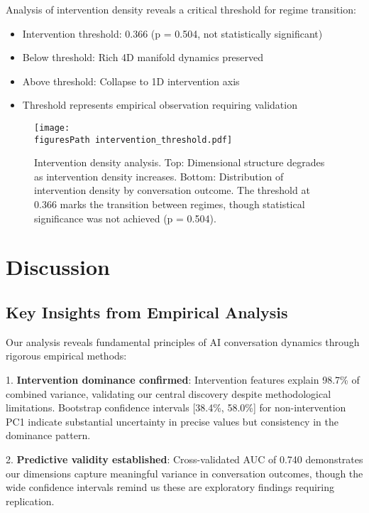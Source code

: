 \documentclass[11pt,letterpaper]{article}
\newcommand{\allFeaturesPCOne}{98.7\%}  %
\newcommand{\nonInterventionPCOneCILower}{38.4\%}
\newcommand{\nonInterventionPCOneCIUpper}{58.0\%}
\newcommand{\testAUC}{0.740}
\newcommand{\interventionThreshold}{0.366}
\newcommand{\interventionThresholdPValue}{0.504}
\newcommand{\figuresPath}{../analysis/rigorous_analysis_outputs/figures/}
\begin{document}
Analysis of intervention density reveals a critical threshold for regime transition:

\begin{itemize}
    \item Intervention threshold: \interventionThreshold{} (p = \interventionThresholdPValue{}, not statistically significant)
    \item Below threshold: Rich 4D manifold dynamics preserved
    \item Above threshold: Collapse to 1D intervention axis
    \item Threshold represents empirical observation requiring validation
\end{itemize}

\begin{figure}[htbp]
\centering
\texttt{[image: \\figuresPath intervention\_threshold.pdf]}
\caption{Intervention density analysis. Top: Dimensional structure degrades as intervention density increases. Bottom: Distribution of intervention density by conversation outcome. The threshold at \interventionThreshold{} marks the transition between regimes, though statistical significance was not achieved (p = \interventionThresholdPValue{}).}
\label{fig:intervention_threshold}
\end{figure}

\section{Discussion}

\subsection{Key Insights from Empirical Analysis}

Our analysis reveals fundamental principles of AI conversation dynamics through rigorous empirical methods:

1. \textbf{Intervention dominance confirmed}: Intervention features explain \allFeaturesPCOne{} of combined variance, validating our central discovery despite methodological limitations. Bootstrap confidence intervals [\nonInterventionPCOneCILower{}, \nonInterventionPCOneCIUpper{}] for non-intervention PC1 indicate substantial uncertainty in precise values but consistency in the dominance pattern.

2. \textbf{Predictive validity established}: Cross-validated AUC of \testAUC{} demonstrates our dimensions capture meaningful variance in conversation outcomes, though the wide confidence intervals remind us these are exploratory findings requiring replication.
\end{document}
